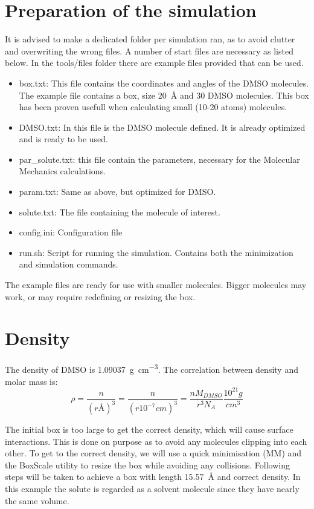 \documentclass[a4paper,fleqn]{report}
\begin{document}
	
	\section{Preparation of the simulation}
	It is advised to make a dedicated folder per simulation ran, as to avoid 
	clutter and overwriting the wrong files.
	A number of start files are necessary as listed below.
	In the tools/files folder there are example files provided that can be 
	used.
	
	\begin{itemize}
		\setlength{\itemsep}{-1pt}
		\setlength{\parsep}{-1pt}
		\item box.txt: This file contains the coordinates and angles of the 
		DMSO molecules. The example file contains a box, size 
		\SI{20}{\angstrom} and 30 DMSO molecules.
		This box has been proven usefull when calculating 
		small (10-20 atoms) molecules.
		\item DMSO.txt: In this file is the DMSO molecule defined. It is 
		already optimized and is ready to be used.
		\item par\_solute.txt: this file contain the parameters, necessary for 
		the Molecular Mechanics calculations.\cite{Robertson2015}
		\item param.txt: Same as above, but optimized for DMSO.\cite{Liu1995}
		\item solute.txt: The file containing the molecule of interest.
		\item config.ini: Configuration file
		\item run.sh: Script for running the simulation. Contains both the 
		minimization and simulation commands.
	\end{itemize}
	
	The example files are ready for use with smaller molecules.
	Bigger molecules may work, or may require redefining or resizing the box.
	
	\section{Density}
	The density of DMSO is \SI{1,09037}{g cm^{-3}}.\cite{Radhamma2008}
	The correlation between density and molar mass is:
	\begin{equation}
	\rho = \dfrac{n}{(r \si{\angstrom})^3} = \dfrac{n}{(r \si{10^{-7} 
	cm})^3} = \dfrac{n M_{DMSO}}{r^3 N_A} \dfrac{10^{21} g}{cm^3}
	\end{equation}
	
	The initial box is too large to get the correct density, which will cause 
	surface interactions. This is done on purpose as to avoid any molecules 
	clipping into each other. To get to the correct density, we will use a 
	quick minimisation (MM) and the BoxScale utility to resize the box while 
	avoiding any collisions.
	Following steps will be taken to achieve a box with length 
	\SI{15,57}{\angstrom} and correct density. In this example the solute is 
	regarded as a solvent molecule since they have nearly the same volume.
	
\end{document}
